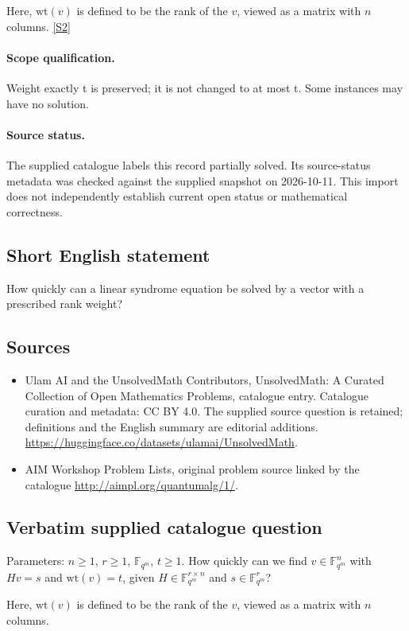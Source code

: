 \documentclass[11pt]{article}
\begin{document}
Here, $\text{wt}(v)$ is defined to be the rank of the $v$, viewed as a matrix with $n$ columns. \href{http://aimpl.org/quantumalg/1/}{[S2]}
\paragraph{Scope qualification.}
Weight exactly t is preserved; it is not changed to at most t. Some instances may have no solution.
\paragraph{Source status.}
The supplied catalogue labels this record partially solved. Its source-status metadata was checked against the supplied snapshot on 2026-10-11. This import does not independently establish current open status or mathematical correctness.
\subsection{Short English statement}
How quickly can a linear syndrome equation be solved by a vector with a prescribed rank weight?
\subsection{Sources}
\begin{itemize}
\item[S1] Ulam AI and the UnsolvedMath Contributors, UnsolvedMath: A Curated Collection of Open Mathematics Problems, catalogue entry. Catalogue curation and metadata: CC BY 4.0. The supplied source question is retained; definitions and the English summary are editorial additions.
\url{https://huggingface.co/datasets/ulamai/UnsolvedMath}.
\item[S2] AIM Workshop Problem Lists, original problem source linked by the catalogue
\url{http://aimpl.org/quantumalg/1/}.
\end{itemize}
\subsection{Verbatim supplied catalogue question}
Parameters: $n \geq 1$, $r\geq 1$, $\mathbb F_{q^m}$, $t \geq 1$. How quickly can we find $v\in \mathbb F_{q^m}^n$ with $Hv = s$ and $\text{wt}(v) = t$, given $H\in \mathbb F_{q^m}^{r\times n}$ and $s\in \mathbb F_{q^m}^r$?

Here, $\text{wt}(v)$ is defined to be the rank of the $v$, viewed as a matrix with $n$ columns.
\end{document}
